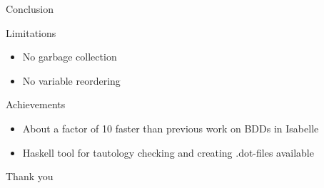 \documentclass[%
	sans,
	12pt,
]{beamer}
\begin{document}
\begin{frame}{Conclusion}
	\begin{block}{Limitations}
		\begin{itemize}
			\item No garbage collection
			\item No variable reordering
		\end{itemize}
	\end{block}
	\begin{block}{Achievements}
		\begin{itemize}
			\item About a factor of 10 faster than previous work on BDDs in Isabelle
      \item Haskell tool for tautology checking and creating .dot-files
            available
		\end{itemize}
	\end{block}
\end{frame}


\begin{frame}[c]
\begin{center}
Thank you
\end{center}
\end{frame}
\end{document}
